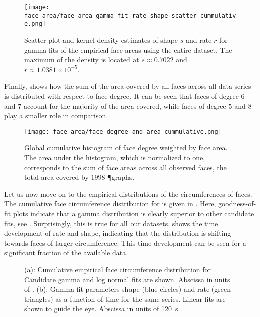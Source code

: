 		\begin{figure}[!htbp]
			\centering
				\texttt{[image: face\_area/face\_area\_gamma\_fit\_rate\_shape\_scatter\_cummulative.png]}
			\caption[Face area distribution - Fit parameter densities]{Scatter-plot and kernel density estimates of shape $s$ and rate $r$ for gamma fits of the empirical face areas using the entire dataset. The maximum of the density is located at $s \approx 0.7022$ and $r \approx 1.0381 \times 10^{-5}$.}
			\label{fig:face_area_kde}
		\end{figure}

		Finally,  shows how the sum of the area covered by all faces across all data series is distributed with respect to face degree. It can be seen that faces of degree $6$ and $7$ account for the majority of the area covered, while faces of degree $5$ and $8$ play a smaller role in comparison. 

		\begin{figure}[!htbp]
			\centering
				\texttt{[image: face\_area/face\_degree\_and\_area\_cummulative.png]}
			\caption[Face degree weighted by face area]{Global cumulative histogram of face degree weighted by face area. The area under the histogram, which is normalized to one, corresponds to the sum of face areas across all observed faces, \ie the total area covered by $1998$ \P graphs.}
			\label{fig:face_degree_per_area}
		\end{figure}

		Let us now move on to the empirical distributions of the circumferences of faces. The cumulative face circumference distribution for  is given in . Here, goodness-of-fit plots indicate that a gamma distribution is clearly superior to other candidate fits, see . Surprisingly, this is true for all our datasets.  shows the time development of rate and shape, indicating that the distribution is shifting towards faces of larger circumference. This time development can be seen for a significant fraction of the available data.

		\begin{figure}
			\centering
			\qquad

			\caption[Face circumference distribution]{(a): Cumulative empirical face circumference distribution for . Candidate gamma and log normal fits are shown. Abscissa in units of \si{\pixel}. (b): Gamma fit parameters shape (blue circles) and rate (green triangles) as a function of time for the same series. Linear fits are shown to guide the eye. Abscissa in units of \SI{120}{\second}.}
			\label{fig:face_length_fit}
		\end{figure}

